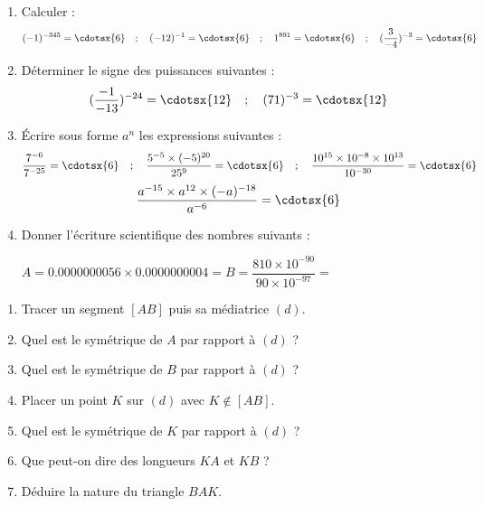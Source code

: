 \documentclass[a4paper,12pt]{article}
\begin{document}
\devoir[prv=true,ds=true,num=2 ,niv=2 , date=22/12/2022]

\begin{exo}[12]
\begin{enumerate}
\item Calculer : 
\[
 (-1)^{-345}=\cdotsx{6} \quad; \quad (-12)^{-1}=\cdotsx{6} \quad; \quad 1^{891}=\cdotsx{6} \quad; \quad (\dfrac{3}{-4})^{-3}=\cdotsx{6}
\]
\item Déterminer le signe des puissances suivantes :
\[ (\dfrac{-1}{-13})^{-24}=\cdotsx{12} \quad; \quad 
	(71)^{-3}=\cdotsx{12}
\] 
\item Écrire sous forme $a^{n}$ les expressions suivantes :
\[\dfrac{7^{-6}}{7^{-25}}=\cdotsx{6}\quad; \quad
	\dfrac{5^{-5}\times (-5)^{20}}{25^{9}}=\cdotsx{6}\quad; \quad
	\dfrac{10^{15}\times 10^{-8}\times 10^{13}}{10^{-30}}=\cdotsx{6}
\]
\[
\dfrac{a^{-15}\times a^{12}\times (-a)^{-18}}{a^{-6}}=\cdotsx{6}
\]
\item Donner l'écriture scientifique des nombres suivants :

$A=0.0000000056\times 0.0000000004=$\anserline[1]
$B=\dfrac{810\times 10^{-90}}{90\times 10^{-97}}=$\anserline[1]
\end{enumerate}
\end{exo}

\begin{exo}[8]
\begin{enumerate}
\item Tracer un segment $[AB]$ puis sa médiatrice $(d)$.
\item Quel est le symétrique de $A$ par rapport à $(d)$ ?
\item Quel est le symétrique de $B$ par rapport à $(d)$ ?
\item Placer un point $K$ sur $(d)$ avec $K\notin [AB]$.
\item Quel est le symétrique de $K$ par rapport à $(d)$ ?
\item Que peut-on dire des longueurs $KA$ et $KB$ ?
\item Déduire la nature du triangle $BAK$.
\end{enumerate}
\end{exo}
\end{document}
